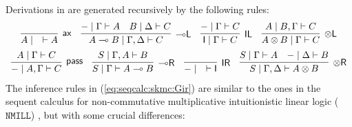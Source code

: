 \documentclass[submission,copyright,creativecommons]{eptcs}
\theoremstyle{definition}
\newcommand{\tl}{\otimes \mathsf{L}}
\newcommand{\tr}{\otimes\mathsf{R}}
\newcommand{\pass}{\mathsf{pass}}
\newcommand{\unitl}{\mathsf{IL}}
\newcommand{\unitr}{\mathsf{IR}}
\newcommand{\ax}{\mathsf{ax}}
\newcommand{\ot}{\otimes}
\newcommand{\lolli}{\multimap}
\newcommand{\lleft}{{\lolli}\mathsf{L}}
\newcommand{\lright}{{\lolli}\mathsf{R}}
\newcommand{\illol}{\rotatebox[origin=c]{180}{$\multimap$}}
\newcommand{\I}{\mathsf{I}}
\newcommand{\vdG}{\vdash}
\newcommand{\NMILL}{$\mathtt{NMILL}$}
\newcommand{\LSkG}{$\mathtt{LSkG}$}
\begin{document}
Derivations in are generated recursively by the following rules:
\begin{equation}\label{eq:seqcalc:skmc:Gir}
	  \begin{array}{c}
		\infer[\ax]{A \mid \quad \vdG A}{}
		\quad
		\infer[\lleft]{A \lolli B \mid \Gamma , \Delta \vdG C}{
		  {-} \mid \Gamma \vdG A
		  &
		  B \mid \Delta \vdG C
		}
		\quad
		\infer[\unitl]{\I \mid \Gamma \vdG C}{{-} \mid \Gamma \vdG C}
		\quad
		\infer[\tl]{A \ot B \mid \Gamma \vdG C}{A \mid B , \Gamma \vdG C}
		\\[5pt]
    \infer[\pass]{{-} \mid A , \Gamma \vdG C}{A \mid \Gamma \vdG C}
		\quad
		\infer[\lright]{S \mid \Gamma \vdG A \lolli B}{S \mid \Gamma , A \vdG B}
		\quad
		\infer[\unitr]{{-} \mid \quad \vdG \I}{}
		\quad
		\infer[\tr]{S \mid \Gamma , \Delta \vdG A \ot B}{
		  S \mid \Gamma \vdG A
		  &
		  {-} \mid \Delta \vdG B
		}
	  \end{array}
	\end{equation}
The inference rules in (\ref{eq:seqcalc:skmc:Gir}) are similar to the ones in the sequent calculus for non-commutative multiplicative intuitionistic linear logic (\NMILL) \cite{abrusci:noncommutative:1990}, but with some crucial differences: 
\end{document}
